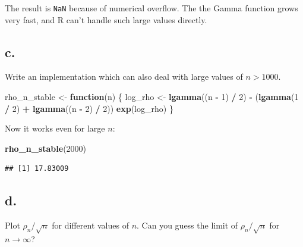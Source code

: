 \documentclass[
]{article}
\newenvironment{Shaded}{\begin{snugshade}}{\end{snugshade}}
\newcommand{\ControlFlowTok}[1]{\textcolor[rgb]{0.13,0.29,0.53}{\textbf{#1}}}
\newcommand{\DecValTok}[1]{\textcolor[rgb]{0.00,0.00,0.81}{#1}}
\newcommand{\FunctionTok}[1]{\textcolor[rgb]{0.13,0.29,0.53}{\textbf{#1}}}
\newcommand{\NormalTok}[1]{#1}
\newcommand{\OtherTok}[1]{\textcolor[rgb]{0.56,0.35,0.01}{#1}}
\newcommand{\SpecialCharTok}[1]{\textcolor[rgb]{0.81,0.36,0.00}{\textbf{#1}}}
\begin{document}
The result is \texttt{NaN} because of numerical overflow. The the Gamma
function grows very fast, and R can't handle such large values directly.

\subsection{c.}\label{c.-1}

Write an implementation which can also deal with large values of
\(n>1000\).

\begin{Shaded}
\begin{Highlighting}[]
\NormalTok{rho\_n\_stable }\OtherTok{\textless{}{-}} \ControlFlowTok{function}\NormalTok{(n) \{}
\NormalTok{  log\_rho }\OtherTok{\textless{}{-}} \FunctionTok{lgamma}\NormalTok{((n }\SpecialCharTok{{-}} \DecValTok{1}\NormalTok{) }\SpecialCharTok{/} \DecValTok{2}\NormalTok{) }\SpecialCharTok{{-}}\NormalTok{ (}\FunctionTok{lgamma}\NormalTok{(}\DecValTok{1} \SpecialCharTok{/} \DecValTok{2}\NormalTok{) }\SpecialCharTok{+} \FunctionTok{lgamma}\NormalTok{((n }\SpecialCharTok{{-}} \DecValTok{2}\NormalTok{) }\SpecialCharTok{/} \DecValTok{2}\NormalTok{))}
  \FunctionTok{exp}\NormalTok{(log\_rho)}
\NormalTok{\}}
\end{Highlighting}
\end{Shaded}

Now it works even for large \(n\):

\begin{Shaded}
\begin{Highlighting}[]
\FunctionTok{rho\_n\_stable}\NormalTok{(}\DecValTok{2000}\NormalTok{)}
\end{Highlighting}
\end{Shaded}

\begin{verbatim}
## [1] 17.83009
\end{verbatim}

\subsection{d.~}\label{d.}

Plot \(\rho_n/\sqrt{n}\) for different values of \(n\). Can you guess
the limit of \(\rho_n/\sqrt{n}\) for \(n \rightarrow\infty\)?
\end{document}
